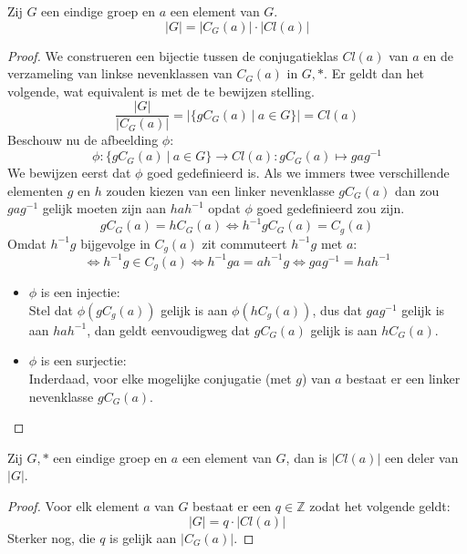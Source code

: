 \documentclass[main.tex]{subfiles}
\begin{document}
\begin{st}
  \label{st:orde-conjugatieklasse-centralisator}
  Zij $G$ een eindige groep en $a$ een element van $G$.
  \[ |G| = |C_{G}(a)|\cdot|Cl(a)| \]

  \begin{proof}
    We construeren een bijectie tussen de conjugatieklas $Cl(a)$ van $a$ en de verzameling van linkse nevenklassen van $C_{G}(a)$ in $G,*$.
    Er geldt dan het volgende, wat equivalent is met de te bewijzen stelling.
    \[ \frac{|G|}{|C_{G}(a)|} = |\{ gC_{G}(a) \ |\ a \in G \}| = Cl(a) \]
    Beschouw nu de afbeelding $\phi$:
    \[ \phi: \{ gC_{G}(a) \ |\ a \in G \} \rightarrow Cl(a): gC_{G}(a) \mapsto gag^{-1} \]
    We bewijzen eerst dat $\phi$ goed gedefinieerd is.
    Als we immers twee verschillende elementen $g$ en $h$ zouden kiezen van een linker nevenklasse $gC_{G}(a)$ dan zou $gag^{-1}$ gelijk moeten zijn aan $hah^{-1}$ opdat $\phi$ goed gedefinieerd zou zijn.
    \[ gC_{G}(a) = hC_{G}(a) \Leftrightarrow h^{-1}gC_{G}(a) = C_{g}(a) \]
    Omdat $h^{-1}g$ bijgevolge in $C_{g}(a)$ zit commuteert $h^{-1}g$ met $a$:
    \[ \Leftrightarrow h^{-1}g \in C_{g}(a) \Leftrightarrow h^{-1}ga = ah^{-1}g \Leftrightarrow gag^{-1} = hah^{-1} \]
    \begin{itemize}
    \item $\phi$ is een injectie:\\
      Stel dat $\phi(gC_{g}(a))$ gelijk is aan $\phi(hC_{g}(a))$, dus dat $gag^{-1}$ gelijk is aan $hah^{-1}$, dan geldt eenvoudigweg dat $gC_{G}(a)$ gelijk is aan $hC_{G}(a)$.
    \item $\phi$ is een surjectie:\\
      Inderdaad, voor elke mogelijke conjugatie (met $g$) van $a$ bestaat er een linker nevenklasse $gC_{G}(a)$.
    \end{itemize}
  \end{proof}
\end{st}

\begin{gev}
  \label{gev:orde-conjugatieklasse-deelt-orde-groep}
  Zij $G,*$ een eindige groep en $a$ een element van $G$, dan is $|Cl(a)|$ een deler van $|G|$.
  
  \begin{proof}
    Voor elk element $a$ van $G$ bestaat er een $q \in \mathbb{Z}$ zodat het volgende geldt:
    \[ |G| = q \cdot |Cl(a)| \]
    Sterker nog, die $q$ is gelijk aan $|C_{G}(a)|$.
  \end{proof}
\end{gev}
\end{document}
